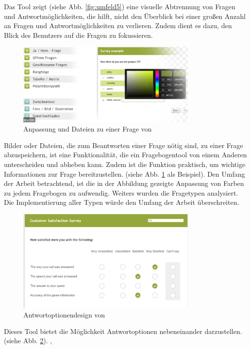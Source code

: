 Das Tool zeigt (siehe Abb. \ref{fig:umfeld5}) eine visuelle Abtrennung von Fragen und Antwortmöglichkeiten, 
die hilft, nicht den Überblick bei einer großen Anzahl an Fragen und Antwortmöglichkeiten zu verlieren. 
Zudem dient es dazu, den Blick des Benutzers auf die Fragen zu fokussieren.
\begin{figure}[H]
    \includegraphics[width=0.8\textwidth]{pics/umfrageonline_com_erstellen.PNG}
    \centering
    \caption{Anpassung und Dateien zu einer Frage von \cite{noauthor_fragebogen_nodate-7} }
    \label{fig:umfeld6}
\end{figure}

Bilder oder Dateien, die zum Beantworten einer Frage nötig sind, zu einer Frage abzuspeichern, ist 
eine Funktionalität, die ein Fragebogentool von einem Anderen unterscheiden und abheben kann. Zudem ist die Funktion praktisch,
um wichtige Informationen zur Frage bereitzustellen. (siehe Abb. \ref{fig:umfeld6} als Beispiel). 
Den Umfang der Arbeit betrachtend, ist die in der Abbildung gezeigte Anpassung von Farben zu jedem Fragebogen zu aufwendig. 
Weiters wurden die Fragetypen analysiert. Die Implementierung aller Typen würde 
den Umfang der Arbeit überschreiten.

\begin{figure}[H]
    \includegraphics[width=0.8\textwidth]{pics/Umfrageonline_com_BlockanFragen.PNG}
    \centering
    \caption{Antwortoptionendesign von \cite{noauthor_fragebogen_nodate-7} }
    \label{fig:umfeld7}
\end{figure}

Dieses Tool bietet die Möglichkeit Antwortoptionen nebeneinander darzustellen.(siehe Abb. \ref{fig:umfeld7}). \cite{noauthor_fragebogen_nodate-7}, \cite{noauthor_pdflatex_nodate}